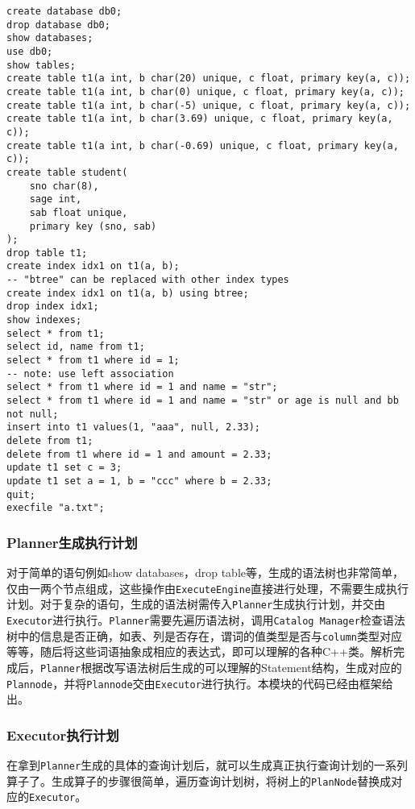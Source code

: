 \documentclass[12pt]{article}
\begin{document}
\begin{lstlisting}
create database db0;
drop database db0;
show databases;
use db0;
show tables;
create table t1(a int, b char(20) unique, c float, primary key(a, c));
create table t1(a int, b char(0) unique, c float, primary key(a, c));
create table t1(a int, b char(-5) unique, c float, primary key(a, c));
create table t1(a int, b char(3.69) unique, c float, primary key(a, c));
create table t1(a int, b char(-0.69) unique, c float, primary key(a, c));
create table student(
    sno char(8),
    sage int,
    sab float unique,
    primary key (sno, sab)
);
drop table t1;
create index idx1 on t1(a, b);
-- "btree" can be replaced with other index types
create index idx1 on t1(a, b) using btree;
drop index idx1;
show indexes;
select * from t1;
select id, name from t1;
select * from t1 where id = 1;
-- note: use left association
select * from t1 where id = 1 and name = "str";
select * from t1 where id = 1 and name = "str" or age is null and bb not null;
insert into t1 values(1, "aaa", null, 2.33);
delete from t1;
delete from t1 where id = 1 and amount = 2.33;
update t1 set c = 3;
update t1 set a = 1, b = "ccc" where b = 2.33;
quit;
execfile "a.txt";
\end{lstlisting}

    \subsubsection{Planner生成执行计划}
    对于简单的语句例如show databases，drop table等，生成的语法树也非常简单，仅由一两个节点组成，这些操作由\texttt{ExecuteEngine}直接进行处理，不需要生成执行计划。对于复杂的语句，生成的语法树需传入\texttt{Planner}生成执行计划，并交由\texttt{Executor}进行执行。\texttt{Planner}需要先遍历语法树，调用\texttt{Catalog Manager}检查语法树中的信息是否正确，如表、列是否存在，谓词的值类型是否与\texttt{column}类型对应等等，随后将这些词语抽象成相应的表达式，即可以理解的各种C++类。解析完成后，\texttt{Planner}根据改写语法树后生成的可以理解的Statement结构，生成对应的\texttt{Plannode}，并将\texttt{Plannode}交由\texttt{Executor}进行执行。本模块的代码已经由框架给出。

    \subsubsection{Executor执行计划}
    在拿到\texttt{Planner}生成的具体的查询计划后，就可以生成真正执行查询计划的一系列算子了。生成算子的步骤很简单，遍历查询计划树，将树上的\texttt{PlanNode}替换成对应的\texttt{Executor}。
\end{document}
